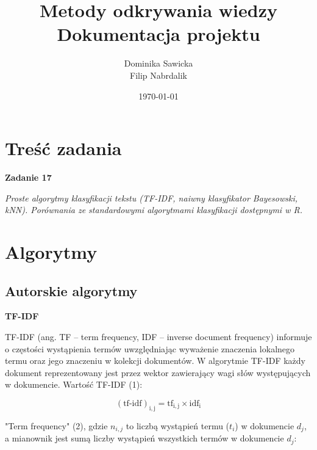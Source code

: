 \documentclass[a4paper, 10pt]{article}
\title{{\bf {Metody odkrywania wiedzy }} \\ {\large Dokumentacja projektu}}
\date{\today}
\author{Dominika Sawicka \\Filip Nabrdalik}
\begin{document}

\null  %
\nointerlineskip  %
\vfill
\let\snewpage \newpage
\let\newpage \relax
\maketitle %
\let \newpage \snewpage
\vfill
\break %

\tableofcontents

\newpage






\section{Treść zadania}

{\bf{Zadanie 17}}

{\it Proste algorytmy klasyfikacji tekstu (TF-IDF, naiwny klasyfikator Bayesowski, kNN). Porównania ze standardowymi algorytmami klasyfikacji dostępnymi w R.}


\section{Algorytmy}
	\subsection{Autorskie algorytmy}
	{\bf{TF-IDF}}

TF-IDF (ang. TF – term frequency, IDF – inverse document frequency) informuje o częstości wystąpienia termów uwzględniając 
wyważenie znaczenia lokalnego termu oraz jego znaczeniu w kolekcji dokumentów. W algorytmie TF-IDF każdy dokument reprezentowany
jest przez wektor zawierający wagi słów występujących w dokumencie. Wartość TF-IDF (1):


\begin{equation}
\mathrm{(tf\mbox{-}idf)_{i,j}} = \mathrm{tf_{i,j}} \times  \mathrm{idf_{i}}
\end{equation}

"Term frequency" (2), gdzie $n_{i,j}$ to liczbą wystąpień termu ($t_{i}$) w dokumencie $d_{j}$, a mianownik jest sumą liczby wystąpień wszystkich termów w dokumencie $d_{j}$:
 
\end{document}
